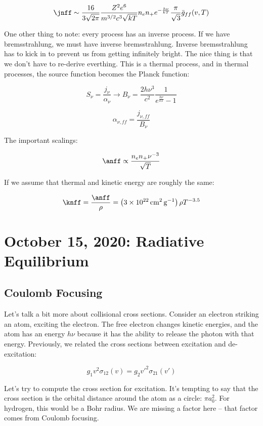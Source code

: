\documentclass{article}
\newcommand{\unit}[1]{{\,\rm #1}}
\newcommand{\planck}{\frac{2h\nu^3}{c^2} \frac{1}{e^{\frac{h\nu}{kT}} - 1}}
\newcommand{\cm}{\unit{cm}}
\newcommand{\g}{\unit{g}}
\def\sigot{\sigma_{12}}
\def\sigto{\sigma_{21}}
\def\sigot{\sigma_{12}}
\def\sigto{\sigma_{21}}
\begin{document}
$$
\jnff \sim \frac{16}{3\sqrt{2\pi}} \frac{Z^2 e^6}{m^{3/2} c^3 \sqrt{kT}} n_e n_+ e^{-\frac{h\nu}{kT}}\frac{\pi}{\sqrt{3}} \bar{g}_{ff}(v,T)
$$

One other thing to note: every process has an inverse process. If we have bremsstrahlung, we must have inverse bremsstrahlung. Inverse bremsstrahlung has to kick in to prevent us from getting infinitely bright. The nice thing is that we don't have to re-derive everthing. This is a thermal process, and in thermal processes, the source function becomes the Planck function:

$$
S_\nu = \frac{j_\nu}{\alpha_\nu} \rightarrow B_\nu = \planck 
$$

$$
\alpha_{\nu,ff} = \frac{j_{\nu,ff}}{B_{\nu}}
$$

The important scalings:

$$
\anff \propto \frac{n_e n_+ \nu^{-3}}{\sqrt{T}}
$$

If we assume that thermal and kinetic energy are roughly the same:

$$
\knff = \frac{\anff}{\rho} = \left(3 \times 10^{22} \cm^2 \g^{-1}\right) \rho T^{-3.5}
$$


\newpage
\section{October 15, 2020: Radiative Equilibrium}

\subsection{Coulomb Focusing}

Let's talk a bit more about collisional cross sections. Consider an electron striking an atom, exciting the electron. The free electron changes kinetic energies, and the atom has an energy $h\nu$ because it has the ability to release the photon with that energy. Previously, we related the cross sections between excitation and de-excitation:

$$
g_1 v^2 \sigot(v) = g_2 v'^2 \sigto(v')
$$

Let's try to compute the cross section for excitation. It's tempting to say that the cross section is the orbital distance around the atom as a circle: $\pi a_0^2$. For hydrogen, this would be a Bohr radius. We are missing a factor here -- that factor comes from Coulomb focusing. 
\end{document}
